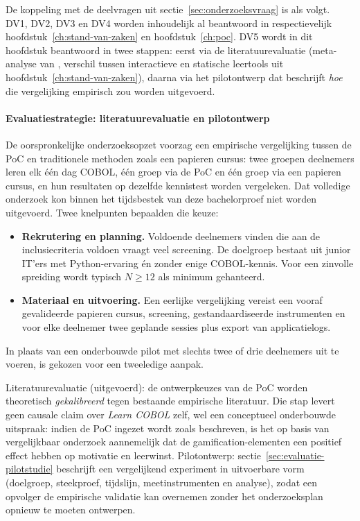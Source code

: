 De koppeling met de deelvragen uit sectie~\ref{sec:onderzoeksvraag} is als volgt.
DV1, DV2, DV3 en DV4 worden inhoudelijk al beantwoord in respectievelijk hoofdstuk~\ref{ch:stand-van-zaken} en hoofdstuk~\ref{ch:poc}.
DV5 wordt in dit hoofdstuk beantwoord in twee stappen: eerst via de literatuurevaluatie (meta-analyse van \textcite{Zhan2022}, verschil tussen interactieve en statische leertools uit hoofdstuk~\ref{ch:stand-van-zaken}), daarna via het pilotontwerp dat beschrijft \emph{hoe} die vergelijking empirisch zou worden uitgevoerd.

\paragraph{Evaluatiestrategie: literatuurevaluatie en pilotontwerp}
\label{subsec:evaluatie-keuze}

De oorspronkelijke onderzoeksopzet voorzag een empirische vergelijking tussen de PoC en traditionele methoden zoals een papieren cursus: twee groepen deelnemers leren elk één dag COBOL, één groep via de PoC en één groep via een papieren cursus, en hun resultaten op dezelfde kennistest worden vergeleken.
Dat volledige onderzoek kon binnen het tijdsbestek van deze bachelorproef niet worden uitgevoerd.
Twee knelpunten bepaalden die keuze:

\begin{itemize}
    \item \textbf{Rekrutering en planning.} Voldoende deelnemers vinden die aan de inclusiecriteria voldoen vraagt veel screening. De doelgroep bestaat uit junior IT'ers met Python-ervaring én zonder enige COBOL-kennis. Voor een zinvolle spreiding wordt typisch \(N \geq 12\) als minimum gehanteerd.
    \item \textbf{Materiaal en uitvoering.} Een eerlijke vergelijking vereist een vooraf gevalideerde papieren cursus, screening, gestandaardiseerde instrumenten en voor elke deelnemer twee geplande sessies plus export van applicatielogs.
\end{itemize}

In plaats van een onderbouwde pilot met slechts twee of drie deelnemers uit te voeren, is gekozen voor een tweeledige aanpak.


Literatuurevaluatie (uitgevoerd): de ontwerpkeuzes van de PoC worden theoretisch \emph{gekalibreerd} tegen bestaande empirische literatuur.
Die stap levert geen causale claim over \textit{Learn COBOL} zelf, wel een conceptueel onderbouwde uitspraak: indien de PoC ingezet wordt zoals beschreven, is het op basis van vergelijkbaar onderzoek aannemelijk dat de gamification-elementen een positief effect hebben op motivatie en leerwinst.
Pilotontwerp: sectie~\ref{sec:evaluatie-pilotstudie} beschrijft een vergelijkend experiment in uitvoerbare vorm (doelgroep, steekproef, tijdslijn, meetinstrumenten en analyse), zodat een opvolger de empirische validatie kan overnemen zonder het onderzoeksplan opnieuw te moeten ontwerpen.

